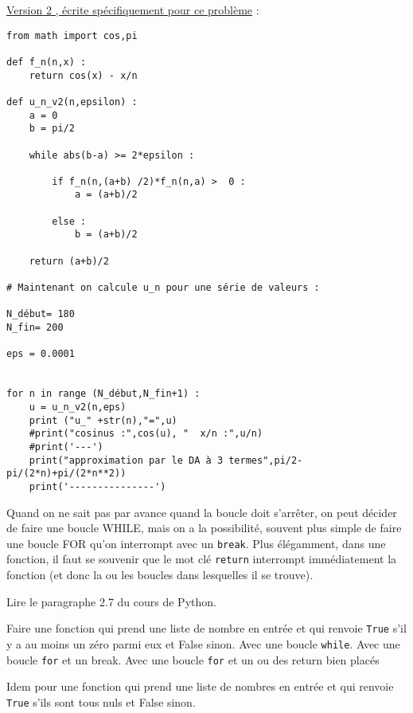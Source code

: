 \begin{correction}
	\nipuce  \ul{Version 2 , écrite spécifiquement pour ce problème} :

	\begin{verbatim}
from math import cos,pi

def f_n(n,x) :
    return cos(x) - x/n

def u_n_v2(n,epsilon) :
    a = 0
    b = pi/2

    while abs(b-a) >= 2*epsilon :

        if f_n(n,(a+b) /2)*f_n(n,a) >  0 :
            a = (a+b)/2

        else :
            b = (a+b)/2

    return (a+b)/2

# Maintenant on calcule u_n pour une série de valeurs :

N_début= 180
N_fin= 200

eps = 0.0001


for n in range (N_début,N_fin+1) :
    u = u_n_v2(n,eps)
    print ("u_" +str(n),"=",u)
    #print("cosinus :",cos(u), "  x/n :",u/n)
    #print('---')
    print("approximation par le DA à 3 termes",pi/2-pi/(2*n)+pi/(2*n**2))
    print('---------------')
\end{verbatim}
\end{correction}

\begin{enonce}
	Quand on ne sait pas par avance quand la boucle doit s'arrêter, on peut décider de faire une boucle WHILE, mais on a la possibilité, souvent plus simple de faire une boucle FOR qu'on interrompt avec un \texttt{break}. Plus élégamment, dans une fonction, il faut se souvenir que le mot clé \texttt{return} interrompt immédiatement la fonction (et donc la ou les boucles dans lesquelles il se trouve).

	\ques Lire le paragraphe 2.7 du cours de Python.



	\ques Faire une fonction qui prend une liste de nombre en entrée et qui renvoie \texttt{True} s'il y a au moins un zéro parmi eux et False sinon.
	\ssques Avec une boucle \texttt{while}.
	\ssques Avec une boucle \texttt{for} et un break.
	\ssques Avec une boucle \texttt{for} et un ou des return bien placés

	\ques Idem pour  une fonction qui prend une liste de nombres en entrée et qui renvoie \texttt{True} s'ils sont tous nuls et False sinon.




\end{enonce}

\begin{correction}

\end{correction}
